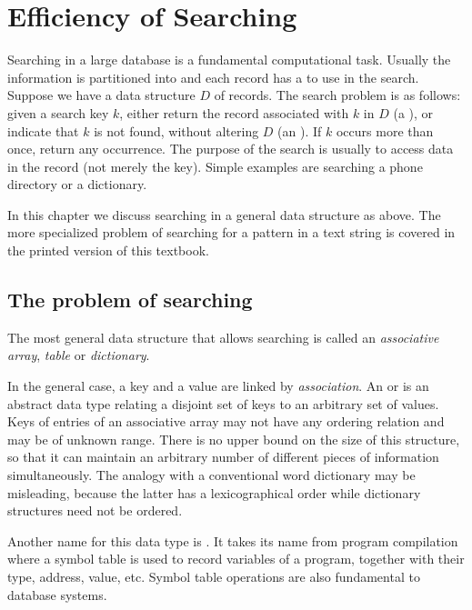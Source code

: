 \chapter{Efficiency of  Searching}
\label{CH:EFF:SEARCH}

Searching in a large database is a fundamental computational
task. Usually the information is partitioned into 
and each record has a  to use in the search. Suppose  we have a 
data structure $D$ of records. The search problem is as follows: given a search 
key $k$, either return the record associated with $k$ in $D$ (a 
), or indicate that $k$ is not found, without 
altering $D$ (an ). If $k$ occurs more than once,
return any occurrence. The purpose of the search is usually to access data in 
the record (not merely the key). Simple examples are  searching a phone 
directory or a dictionary.

In this chapter we discuss searching in a general data structure as above. The 
more specialized problem of searching for a pattern in a text string is covered 
in the printed version of this textbook.

\section{The problem of searching}
\label{sec:search}

The most general data structure that allows searching is called an 
\emph{associative array},  \emph{table} or \emph{dictionary}.

In the general case, a key and a value are linked by \emph{association}.
An  or  is an abstract 
data type relating a disjoint set of keys to an arbitrary set of values. Keys of
entries of an associative array may not have any ordering relation and may be
of unknown range. There is no upper bound on the size of this structure,
so that it can maintain an arbitrary number of different pieces of
information simultaneously. The analogy with a conventional word
dictionary may be misleading, because the latter has a lexicographical
order while dictionary structures need not be ordered.

Another name for this data type is . 
It takes its name from program compilation where
 a symbol table is used to record variables of a program, together with their
type, address, value, etc. Symbol table operations are also
fundamental to database systems.

